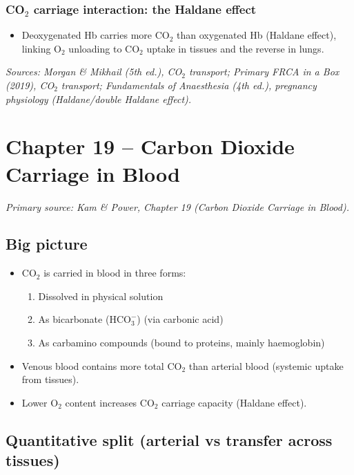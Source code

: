 \documentclass[11pt,a4paper]{article}
\begin{document}
\subsubsection{CO\(_2\) carriage interaction: the Haldane effect}
\begin{itemize}
  \item Deoxygenated Hb carries more CO\(_2\) than oxygenated Hb (Haldane effect), linking O\(_2\) unloading to CO\(_2\) uptake in tissues and the reverse in lungs.
\end{itemize}
\textit{Sources: Morgan \& Mikhail (5th ed.), CO\(_2\) transport; Primary FRCA in a Box (2019), CO\(_2\) transport; Fundamentals of Anaesthesia (4th ed.), pregnancy physiology (Haldane/double Haldane effect).}


\section{Chapter 19 -- Carbon Dioxide Carriage in Blood}
\textit{Primary source: Kam \& Power, Chapter 19 (Carbon Dioxide Carriage in Blood).}

\subsection{Big picture}
\begin{itemize}
  \item \(\mathrm{CO_2}\) is carried in blood in three forms:
  \begin{enumerate}
    \item Dissolved in physical solution
    \item As bicarbonate (\(\mathrm{HCO_3^-}\)) (via carbonic acid)
    \item As carbamino compounds (bound to proteins, mainly haemoglobin)
  \end{enumerate}
  \item Venous blood contains more total \(\mathrm{CO_2}\) than arterial blood (systemic uptake from tissues).
  \item Lower \(\mathrm{O_2}\) content increases \(\mathrm{CO_2}\) carriage capacity (Haldane effect).
\end{itemize}

\subsection{Quantitative split (arterial vs transfer across tissues)}
\end{document}
